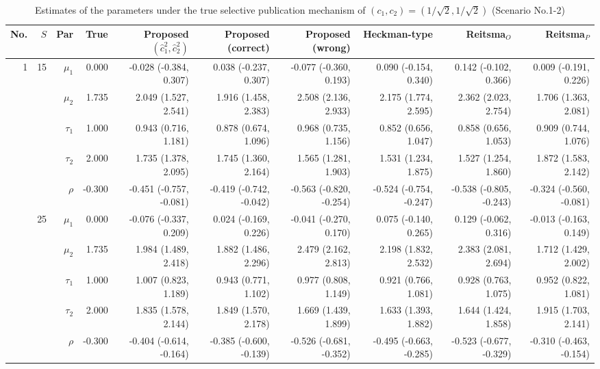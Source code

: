 \documentclass[
]{article}
\begin{document}
\begin{table}

\caption{\label{tab:c11-par1}Estimates of the parameters under the true selective publication mechanism of $(c_1, c_2) = (1/\sqrt{2}, 1/\sqrt{2})$ (Scenario No.1-2)}
\centering
\begin{tabular}[t]{rrrrrrrrrr}
\toprule
No. & $S$ & Par & True & Proposed $(\hat{c}_1^2, \hat{c}_2^2)$ & Proposed (correct) & Proposed (wrong) & Heckman-type & Reitsma$_O$ & Reitsma$_P$\\
\midrule
1 & 15 & $\mu_1$ & 0.000 & -0.028 (-0.384, 0.307) & 0.038 (-0.237, 0.307) & -0.077 (-0.360, 0.193) & 0.090 (-0.154, 0.340) & 0.142 (-0.102, 0.366) & 0.009 (-0.191, 0.226)\\
 &  & $\mu_2$ & 1.735 & 2.049 (1.527, 2.541) & 1.916 (1.458, 2.383) & 2.508 (2.136, 2.933) & 2.175 (1.774, 2.595) & 2.362 (2.023, 2.754) & 1.706 (1.363, 2.081)\\
 &  & $\tau_1$ & 1.000 & 0.943 (0.716, 1.181) & 0.878 (0.674, 1.096) & 0.968 (0.735, 1.156) & 0.852 (0.656, 1.047) & 0.858 (0.656, 1.053) & 0.909 (0.744, 1.076)\\
 &  & $\tau_2$ & 2.000 & 1.735 (1.378, 2.095) & 1.745 (1.360, 2.164) & 1.565 (1.281, 1.903) & 1.531 (1.234, 1.875) & 1.527 (1.254, 1.860) & 1.872 (1.583, 2.142)\\
 &  & $\rho$ & -0.300 & -0.451 (-0.757, -0.081) & -0.419 (-0.742, -0.042) & -0.563 (-0.820, -0.254) & -0.524 (-0.754, -0.247) & -0.538 (-0.805, -0.243) & -0.324 (-0.560, -0.081)\\
\addlinespace
 & 25 & $\mu_1$ & 0.000 & -0.076 (-0.337, 0.209) & 0.024 (-0.169, 0.226) & -0.041 (-0.270, 0.170) & 0.075 (-0.140, 0.265) & 0.129 (-0.062, 0.316) & -0.013 (-0.163, 0.149)\\
 &  & $\mu_2$ & 1.735 & 1.984 (1.489, 2.418) & 1.882 (1.486, 2.296) & 2.479 (2.162, 2.813) & 2.198 (1.832, 2.532) & 2.383 (2.081, 2.694) & 1.712 (1.429, 2.002)\\
 &  & $\tau_1$ & 1.000 & 1.007 (0.823, 1.189) & 0.943 (0.771, 1.102) & 0.977 (0.808, 1.149) & 0.921 (0.766, 1.081) & 0.928 (0.763, 1.075) & 0.952 (0.822, 1.081)\\
 &  & $\tau_2$ & 2.000 & 1.835 (1.578, 2.144) & 1.849 (1.570, 2.178) & 1.669 (1.439, 1.899) & 1.633 (1.393, 1.882) & 1.644 (1.424, 1.858) & 1.915 (1.703, 2.141)\\
 &  & $\rho$ & -0.300 & -0.404 (-0.614, -0.164) & -0.385 (-0.600, -0.139) & -0.526 (-0.681, -0.352) & -0.495 (-0.663, -0.285) & -0.523 (-0.677, -0.329) & -0.310 (-0.463, -0.154)\\

\end{tabular}
\end{table}
\end{document}
